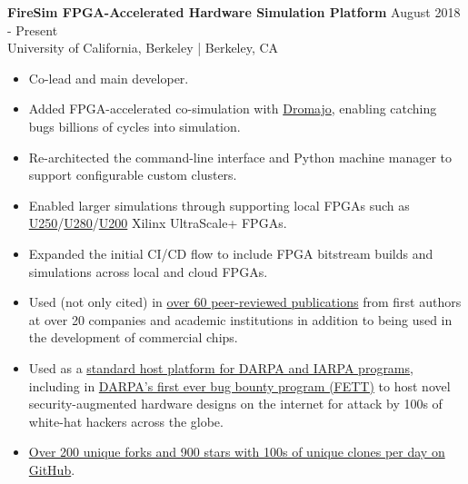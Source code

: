 \documentclass[line]{res}
\begin{document}
\begin{resume}
\label{sec:firesim}
\textbf{FireSim FPGA-Accelerated Hardware Simulation Platform} \hfill August 2018 - Present
\\
University of California, Berkeley | Berkeley, CA
\\
\vspace{-3mm}
\begin{itemize}
\item Co-lead and main developer.
\item Added FPGA-accelerated co-simulation with \href{https://github.com/chipsalliance/dromajo}{Dromajo}, enabling catching bugs billions of cycles into simulation.
\item Re-architected the command-line interface and Python machine manager to support configurable custom clusters.
\item Enabled larger simulations through supporting local FPGAs such as \href{https://www.amd.com/en/products/accelerators/alveo/u250/a-u250-a64g-pq-g.html}{U250}/\href{https://docs.amd.com/r/en-US/ds963-u280}{U280}/\href{https://www.amd.com/en/products/accelerators/alveo/u200/a-u200-a64g-pq-g.html}{U200} Xilinx UltraScale+ FPGAs.
\item Expanded the initial CI/CD flow to include FPGA bitstream builds and simulations across local and cloud FPGAs.
\item Used (not only cited) in \href{https://fires.im/publications/#userpapers}{over 60 peer-reviewed publications} from first authors at over 20 companies and academic institutions in addition to being used in the development of commercial chips.
\item Used as a \href{https://fires.im/workshop-2023/}{standard host platform for DARPA and IARPA programs}, including in \href{https://fett.darpa.mil/}{DARPA's first ever bug bounty program (FETT)} to host novel security-augmented hardware designs on the internet for attack by 100s of white-hat hackers across the globe.
\item \href{https://github.com/firesim/firesim}{Over 200 unique forks and 900 stars with 100s of unique clones per day on GitHub}.
\end{itemize}


\end{resume}
\end{document}
